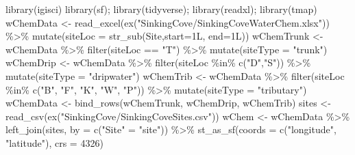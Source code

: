 \documentclass[
]{book}
\newenvironment{Shaded}{\begin{snugshade}}{\end{snugshade}}
\newcommand{\AttributeTok}[1]{\textcolor[rgb]{0.61,0.61,0.61}{#1}}
\newcommand{\DecValTok}[1]{\textcolor[rgb]{0.06,0.06,0.06}{#1}}
\newcommand{\FunctionTok}[1]{\textcolor[rgb]{0,0,0}{#1}}
\newcommand{\NormalTok}[1]{#1}
\newcommand{\OtherTok}[1]{\textcolor[rgb]{0.37,0.37,0.37}{#1}}
\newcommand{\SpecialCharTok}[1]{\textcolor[rgb]{0,0,0}{#1}}
\newcommand{\StringTok}[1]{\textcolor[rgb]{0.5,0.5,0.5}{#1}}
\begin{document}
\begin{Shaded}
\begin{Highlighting}[]
\FunctionTok{library}\NormalTok{(igisci)}
\FunctionTok{library}\NormalTok{(sf); }\FunctionTok{library}\NormalTok{(tidyverse); }\FunctionTok{library}\NormalTok{(readxl); }\FunctionTok{library}\NormalTok{(tmap)}
\NormalTok{wChemData }\OtherTok{\textless{}{-}} \FunctionTok{read\_excel}\NormalTok{(}\FunctionTok{ex}\NormalTok{(}\StringTok{"SinkingCove/SinkingCoveWaterChem.xlsx"}\NormalTok{)) }\SpecialCharTok{\%\textgreater{}\%}
  \FunctionTok{mutate}\NormalTok{(}\AttributeTok{siteLoc =} \FunctionTok{str\_sub}\NormalTok{(Site,}\AttributeTok{start=}\NormalTok{1L, }\AttributeTok{end=}\NormalTok{1L))}
\NormalTok{wChemTrunk }\OtherTok{\textless{}{-}}\NormalTok{ wChemData }\SpecialCharTok{\%\textgreater{}\%} \FunctionTok{filter}\NormalTok{(siteLoc }\SpecialCharTok{==} \StringTok{"T"}\NormalTok{) }\SpecialCharTok{\%\textgreater{}\%} \FunctionTok{mutate}\NormalTok{(}\AttributeTok{siteType =} \StringTok{"trunk"}\NormalTok{)}
\NormalTok{wChemDrip }\OtherTok{\textless{}{-}}\NormalTok{ wChemData }\SpecialCharTok{\%\textgreater{}\%} \FunctionTok{filter}\NormalTok{(siteLoc }\SpecialCharTok{\%in\%} \FunctionTok{c}\NormalTok{(}\StringTok{"D"}\NormalTok{,}\StringTok{"S"}\NormalTok{)) }\SpecialCharTok{\%\textgreater{}\%} \FunctionTok{mutate}\NormalTok{(}\AttributeTok{siteType =} \StringTok{"dripwater"}\NormalTok{)}
\NormalTok{wChemTrib }\OtherTok{\textless{}{-}}\NormalTok{ wChemData }\SpecialCharTok{\%\textgreater{}\%} \FunctionTok{filter}\NormalTok{(siteLoc }\SpecialCharTok{\%in\%} \FunctionTok{c}\NormalTok{(}\StringTok{"B"}\NormalTok{, }\StringTok{"F"}\NormalTok{, }\StringTok{"K"}\NormalTok{, }\StringTok{"W"}\NormalTok{, }\StringTok{"P"}\NormalTok{)) }\SpecialCharTok{\%\textgreater{}\%} 
  \FunctionTok{mutate}\NormalTok{(}\AttributeTok{siteType =} \StringTok{"tributary"}\NormalTok{)}
\NormalTok{wChemData }\OtherTok{\textless{}{-}} \FunctionTok{bind\_rows}\NormalTok{(wChemTrunk, wChemDrip, wChemTrib)}
\NormalTok{sites }\OtherTok{\textless{}{-}} \FunctionTok{read\_csv}\NormalTok{(}\FunctionTok{ex}\NormalTok{(}\StringTok{"SinkingCove/SinkingCoveSites.csv"}\NormalTok{))}
\NormalTok{wChem }\OtherTok{\textless{}{-}}\NormalTok{ wChemData }\SpecialCharTok{\%\textgreater{}\%}
  \FunctionTok{left\_join}\NormalTok{(sites, }\AttributeTok{by =} \FunctionTok{c}\NormalTok{(}\StringTok{"Site"} \OtherTok{=} \StringTok{"site"}\NormalTok{)) }\SpecialCharTok{\%\textgreater{}\%}
  \FunctionTok{st\_as\_sf}\NormalTok{(}\AttributeTok{coords =} \FunctionTok{c}\NormalTok{(}\StringTok{"longitude"}\NormalTok{, }\StringTok{"latitude"}\NormalTok{), }\AttributeTok{crs =} \DecValTok{4326}\NormalTok{)}

\end{Highlighting}
\end{Shaded}
\end{document}

